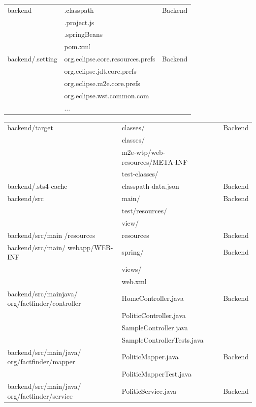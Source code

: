 \documentclass[conference]{IEEEtran}
\begin{document}
\begin{table}[htbp]
\begin{center}
\begin{tabular}{|p{2.5cm}|p{4cm}|p{1.2cm}|}
backend& .classpath & Backend \\
& .project.js & \\
& .springBeans & \\
& pom.xml & \\
\hline
backend/.setting& org.eclipse.core.resources.prefs & Backend \\
& org.eclipse.jdt.core.prefs & \\
& org.eclipse.m2e.core.prefs & \\
& org.eclipse.wst.common.com & \\
& ... & \\
\hline
\end{tabular}
\label{tab1}
\end{center}
\end{table}

 \begin{table}[htbp]
  \renewcommand{\arraystretch}{1.5}
\begin{center}
\begin{tabular}{|p{2.5cm}|p{3.7cm}|p{1.5cm}|}
\hline
backend/target& classes/ & Backend \\
& classes/ & \\
& m2e-wtp/web-resources/META-INF & \\
& test-classes/ & \\
\hline
backend/.sts4-cache & classpath-data.json & Backend \\
\hline
backend/src& main/ & Backend \\
& test/resources/ & \\
& view/ & \\
\hline
backend/src/main /resources & resources & Backend \\
\hline
backend/src/main/ webapp/WEB-INF& spring/ & Backend \\
 & views/ &\\
& web.xml & \\
\hline
backend/src/mainjava/  org/factfinder/controller& HomeController.java & Backend \\
& PoliticController.java & \\
& SampleController.java & \\
& SampleControllerTests.java & \\
\hline
backend/src/main/java/  org/factfinder/mapper& PoliticMapper.java & Backend \\
& PoliticMapperTest.java & \\
\hline
backend/src/main/java/  org/factfinder/service& PoliticService.java & Backend \\

\end{tabular}
\end{center}
\end{table}
\end{document}
